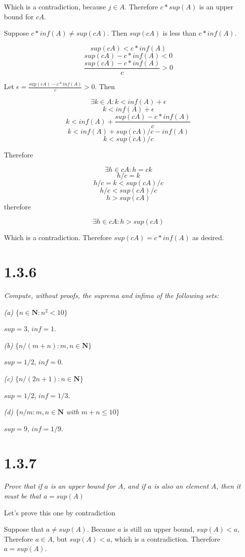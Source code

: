 \documentclass[11pt,oneside,titlepage]{article}
\begin{document}
Which is a contradiction, because $j \in A$. Therefore $c * sup(A)$ is an
upper bound for $cA$.

Suppose $c * inf(A) \neq sup(cA)$. Then $sup(c A)$ is less
than $c * inf(A)$.

$$sup(cA) < c * inf(A)$$
$$sup(cA) - c * inf(A) < 0$$
$$\frac{sup(cA) - c * inf(A)}{c} > 0$$

Let $\epsilon = \frac{sup(cA) - c * inf(A)}{c} > 0$. Then

$$\exists k \in A: k < inf(A) + \epsilon$$
$$ k < inf(A) + \epsilon$$
$$ k < inf(A) + \frac{sup(cA) - c * inf(A)}{c}$$
$$ k < inf(A) + sup(cA)/c - inf(A)$$
$$ k < sup(cA)/c$$

Therefore

$$\exists h \in cA: h = ck$$
$$h/c = k$$
$$h/c = k < sup(cA) / c$$
$$h/c < sup(cA) / c$$
$$h > sup(cA)$$
therefore

$$\exists h \in cA: h > sup(cA)$$

Which is a contradiction. Therefore $sup(cA) = c * inf(A)$ as desired.

\section*{1.3.6}
\textit{Compute, without proofs, the suprema and infima of the following
  sets:}

\textit{(a) $\{n \in \textbf{N}: n^2 < 10\}$}

$sup = 3$, $inf = 1$.

\textit{(b) $\{n/(m + n): m,n\in \textbf{N}\}$}

$sup = 1/2$, $inf = 0$.

\textit{(c) $\{n/(2n + 1): n\in \textbf{N}\}$}

$sup = 1/2$, $inf = 1/3$.

\textit{(d) $\{n/m: m,n\in \textbf{N}$ with $m + n \leq 10\}$}

$sup = 9$, $inf = 1/9$.

\section*{1.3.7}
\textit{Prove that if $a$ is an upper bound for $A$, and if $a$ is also an
  element $A$, then it must be that $a = sup(A)$}

Let's prove this one by contradiction

Suppose that $a \neq sup(A)$. Because $a$ is still an upper bound, $sup(A) <
a$, Therefore $a \in A$, but $sup(A) < a$, which is a contradiction.
Therefore $a = sup(A)$.
\end{document}
